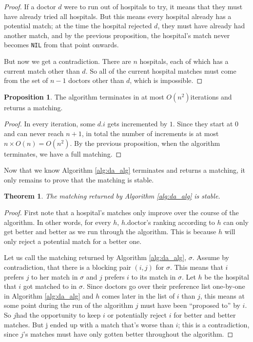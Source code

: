 \documentclass [12pt]{article}
\newtheorem{theorem}{Theorem}
\theoremstyle{definition}
\newtheorem{proposition}{Proposition}
\begin{document}
\begin{proof} If a doctor $d$ were to run out of hospitals to try, it means that they must have already tried all hospitals. But this means every hospital already has a potential match; at the time the hospital rejected $d$, they must have already had another match, and by the previous proposition, the hospital's match never becomes \texttt{NIL} from that point onwards.

But now we get a contradiction. There are $n$ hospitals, each of which has a current match other than $d$. So all of the current hospital matches must come from the set of $n-1$ doctors other than $d$, which is impossible. 
\end{proof}

\begin{proposition} The algorithm terminates in at most $O(n^2) $iterations and returns a matching. 
\end{proposition}
\begin{proof}
In every iteration, some $d.i$ gets incremented by $1$. Since they start at $0$ and can never reach $n + 1$, in total the number of increments is at most $n \times O(n) = O(n^2 )$. By the previous proposition, when the algorithm terminates, we have a full matching. 
\end{proof}


Now that we know Algorithm \ref{alg:da_alg} terminates and returns a matching, it only remains to prove that the matching is stable. 

\begin{theorem}
The matching returned by Algorithm \ref{alg:da_alg} is stable.
\end{theorem}

\begin{proof}
First note that a hospital's matches only improve over the course of the algorithm. In other words, for every $h$, $h$.doctor's ranking according to $h$ can only get better and better as we run through the algorithm. This is because $h$ will only reject a potential match for a better one. 

Let us call the matching returned by Algorithm \ref{alg:da_alg}, $\sigma$. Assume by contradiction, that there is a blocking pair $(i, j)$ for $\sigma$. This means that $i$ prefers $j$ to her match in $\sigma$ and $j$ prefers $i$ to its match in $\sigma$. Let $h$ be the hospital that $i$ got matched to in $\sigma$. Since doctors go over their preference list one-by-one in Algorithm \ref{alg:da_alg} and $h$ comes later in the list of $i$ than $j$, this means at some point during the run of the algorithm $j$ must have been ``proposed to'' by $i$. So $j $had the opportunity to keep $i$ or potentially reject $i$ for better and better matches. But j ended up with a match that's worse than $i$; this is a contradiction, since $j$'s matches must have only gotten better throughout the algorithm.
\end{proof}
\end{document}
